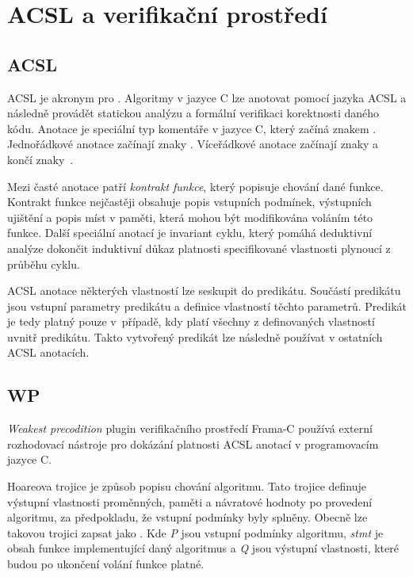 \chapter{ACSL a verifikační prostředí}

\section{ACSL}

ACSL je akronym pro . Algoritmy v jazyce C lze anotovat pomocí jazyka ACSL a následně provádět statickou analýzu a formální verifikaci korektnosti daného kódu. Anotace je speciální typ komentáře v jazyce C, který začíná znakem . Jednořádkové anotace začínají znaky . Víceřádkové anotace začínají znaky  a končí znaky~\uv{*/}. \cite{ACSLSpecification117}

Mezi časté anotace patří \textit{kontrakt funkce}, který popisuje chování dané funkce. Kontrakt funkce nejčastěji obsahuje popis vstupních podmínek, výstupních ujištění a popis míst v paměti, která mohou být modifikována voláním této funkce. Další speciální anotací je invariant cyklu, který pomáhá deduktivní analýze dokončit induktivní důkaz platnosti specifikované vlastnosti plynoucí z průběhu cyklu.

ACSL anotace některých vlastností lze seskupit do predikátu. Součástí predikátu jsou vstupní parametry predikátu a definice vlastností těchto parametrů. Predikát je tedy platný pouze v~případě, kdy platí všechny z definovaných vlastností uvnitř predikátu. Takto vytvořený predikát lze následně používat v ostatních ACSL anotacích. \cite{ACSLSpecification117}


\section{WP}

\textit{Weakest precodition} plugin verifikačního prostředí Frama-C používá externí rozhodovací nástroje pro dokázání platnosti ACSL anotací v programovacím jazyce C. \cite{FramaC24WPManual}

Hoareova trojice je způsob popisu chování algoritmu. Tato trojice definuje výstupní vlastnosti proměnných, paměti a návratové hodnoty po provedení algoritmu, za předpokladu, že vstupní podmínky byly splněny. Obecně lze takovou trojici zapsat jako . Kde \textit{P} jsou vstupní podmínky algoritmu, \textit{stmt} je obsah funkce implementující daný algoritmus a \textit{Q} jsou výstupní vlastnosti, které budou po ukončení volání funkce platné. \cite{FramaC24WPManual}

